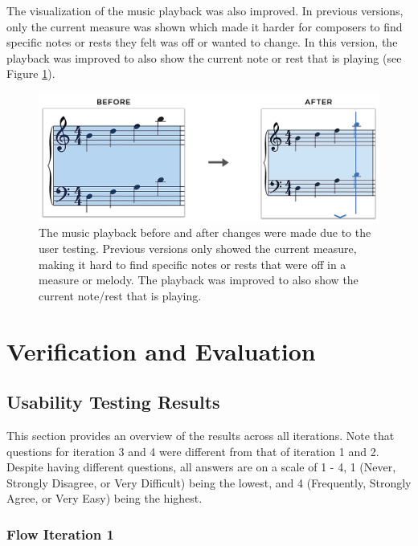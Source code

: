 				The visualization of the music playback was also improved. In previous versions, only the current measure was shown which made it harder for composers to find specific notes or rests they felt was off or wanted to change. In this version, the playback was improved to also show the current note or rest that is playing (see Figure \ref{fig:before-after-playback}).

				\begin{figure}[h]
					\centering
					\includegraphics[scale=0.075]{figures/before-after-playback.png}
				    \caption{The music playback before and after changes were made due to the user testing. Previous versions only showed the current measure, making it hard to find specific notes or rests that were off in a measure or melody. The playback was improved to also show the current note/rest that is playing.}
				    \label{fig:before-after-playback}
				\end{figure}

	\section{Verification and Evaluation}
		\subsection{Usability Testing Results}
			This section provides an overview of the results across all iterations. Note that questions for iteration 3 and 4 were different from that of iteration 1 and 2. Despite having different questions, all answers are on a scale of 1 - 4, 1 (Never, Strongly Disagree, or Very Difficult) being the lowest, and 4 (Frequently, Strongly Agree, or Very Easy) being the highest. 

			\subsubsection{Flow Iteration 1} 

